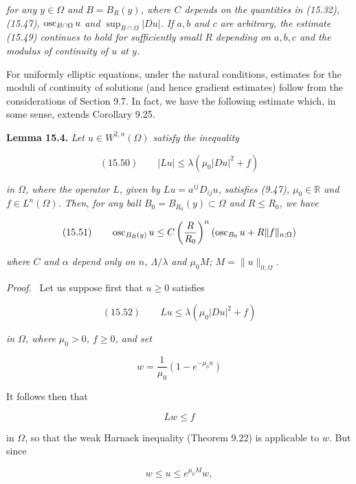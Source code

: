 \textit{for any $y \in \Omega$ and $B = B_R(y)$, where $C$ depends on the quantities in (15.32), (15.47), $\operatorname{osc}_{B\cap \Omega}u$ and $\sup_{B\cap \Omega}|Du|$. If $a,b$ and $c$ are arbitrary, the estimate (15.49) continues to hold for sufficiently small $R$ depending on $a,b,c$ and the modulus of continuity of $u$ at $y$.}

For uniformly elliptic equations, under the natural conditions, estimates for the moduli of continuity of solutions (and hence gradient estimates) follow from the considerations of Section 9.7. In fact, we have the following estimate which, in some sense, extends Corollary 9.25.

\textbf{Lemma 15.4.} \textit{Let $u \in W^{2,n}(\Omega)$ satisfy the inequality}

\begin{equation}
(15.50)\qquad |Lu| \leq \lambda(\mu_0|Du|^2 + f)
\end{equation}

\textit{in $\Omega$, where the operator $L$, given by $Lu = a^{ij}D_{ij}u$, satisfies (9.47), $\mu_0 \in \mathbb{R}$ and $f \in L^n(\Omega)$. Then, for any ball $B_0 = B_{R_0}(y) \subset \Omega$ and $R \leq R_0$, we have}

\begin{equation}
(15.51)\qquad \operatorname{osc}_{B_R(y)} u \leq C\left(\frac{R}{R_0}\right)^\alpha \left(\operatorname{osc}_{B_0}u + R\|f\|_{n;\Omega}\right)
\end{equation}

\textit{where $C$ and $\alpha$ depend only on $n$, $\Lambda/\lambda$ and $\mu_0 M$; $M = \|u\|_{0;\Omega}$.}

\textit{Proof.} \ Let us suppose first that $u \geq 0$ satisfies

\begin{equation}
(15.52)\qquad Lu \leq \lambda(\mu_0|Du|^2 + f)
\end{equation}

\textit{in $\Omega$, where $\mu_0 > 0$, $f \geq 0$, and set}

\[
w = \frac{1}{\mu_0}\left(1 - e^{-\mu_0 u}\right)
\]



It follows then that

\[
Lw \leq f
\]

in $\Omega$, so that the weak Harnack inequality (Theorem 9.22) is applicable to $w$. But since

\[
w \leq u \leq e^{\mu_0 M}w,
\]

